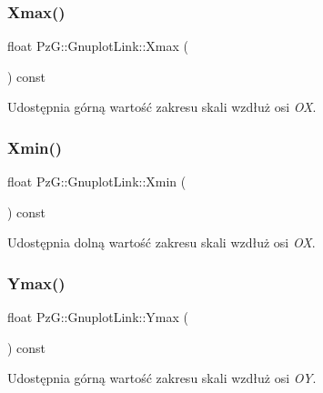 \subsubsection{\texorpdfstring{Xmax()}{Xmax()}}
{\footnotesize\ttfamily float Pz\+G\+::\+Gnuplot\+Link\+::\+Xmax (\begin{DoxyParamCaption}{ }\end{DoxyParamCaption}) const\hspace{0.3cm}{\ttfamily [inline]}}

Udostępnia górną wartość zakresu skali wzdłuż osi {\itshape OX}. \mbox{\label{class_pz_g_1_1_gnuplot_link_a8817b7aee867b4ebdf493a091a32bad0}} 
\subsubsection{\texorpdfstring{Xmin()}{Xmin()}}
{\footnotesize\ttfamily float Pz\+G\+::\+Gnuplot\+Link\+::\+Xmin (\begin{DoxyParamCaption}{ }\end{DoxyParamCaption}) const\hspace{0.3cm}{\ttfamily [inline]}}

Udostępnia dolną wartość zakresu skali wzdłuż osi {\itshape OX}. \mbox{\label{class_pz_g_1_1_gnuplot_link_a7311b56e882f8bf334c1afbceb51a734}} 
\subsubsection{\texorpdfstring{Ymax()}{Ymax()}}
{\footnotesize\ttfamily float Pz\+G\+::\+Gnuplot\+Link\+::\+Ymax (\begin{DoxyParamCaption}{ }\end{DoxyParamCaption}) const\hspace{0.3cm}{\ttfamily [inline]}}

Udostępnia górną wartość zakresu skali wzdłuż osi {\itshape OY}. \mbox{\label{class_pz_g_1_1_gnuplot_link_a9a8112464c85c3a72723079c84446789}} 
